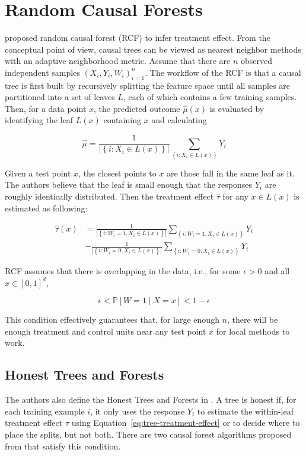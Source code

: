\documentclass{article}
\begin{document}
\section{Random Causal Forests}
\cite{wager2015estimation} proposed random causal forest (RCF) to
infer treatment effect. From the conceptual point of view, causal trees can be viewed as
nearest neighbor methods with an adaptive neighborhood metric. Assume
that there are $n$ observed independent samples $(X_i, Y_i,
W_i)_{i=1}^n$. The workflow of the RCF is that a causal tree is first
built by recursively splitting the feature space until all samples are
partitioned into a set of leaves $L$, each of which contains a few
training samples. Then, for a data point $x$, the predicted outcome $\hat{\mu}(x)$
is evaluated by identifying the leaf $L(x)$ containing $x$ and
calculating

$$\hat{\mu} = \frac{1}{\left | \left \{ i: X_i \in L(x) \right \}
  \right |} \sum_{\left \{ i: X_i \in L(x) \right \}} Y_i$$

Given a test point $x$, the closest points to $x$ are those fall in the same
leaf as it. The authors believe that the leaf is small enough that the
responses $Y_i$ are roughly identically distributed. Then the
treatment effect $\hat{\tau}$ for any $x \in L(x)$ is estimated as
following:

\begin{align} 
\hat{\tau}(x) & = \frac{1}{\left | \left \{ i: W_i=1, X_i \in L(x) \right \}
                \right |} \sum_{\left \{ i: W_i = 1, X_i \in L(x)
                \right \}} Y_i \nonumber \\
              & - \frac{1}{\left | \left \{ i: W_i=0, X_i \in L(x) \right \}
  \right |} \sum_{\left \{ i: W_i = 0, X_i \in L(x) \right \}} Y_i \label{eq:tree-treatment-effect}
\end{align}

RCF assumes that
there is overlapping in the data, i.e., for some $\epsilon > 0$ and
all $x \in \left [ 0, 1\right ]^d$,

$$\epsilon < \mathbb{P}\left [ W=1 \mid X=x \right ] < 1-\epsilon$$

This condition effectively guarantees that, for large enough $n$,
there will be enough treatment and control units near any test point
$x$ for local methods to work.

\subsection{Honest Trees and Forests}
The authors also define the Honest Trees and Forests in \cite{wager2015estimation}.
A tree is honest if, for each training example $i$, it only uses the
response $Y_i$ to estimate the within-leaf treatment effect $\tau$
using Equation~\ref{eq:tree-treatment-effect} or
to decide where to place the splits, but not
both. There are two causal forest algorithms proposed from
\cite{wager2015estimation} that satisfy this condition.
\end{document}
